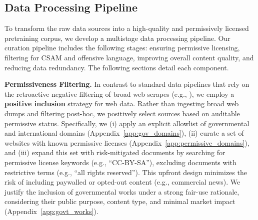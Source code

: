 \subsection{Data Processing Pipeline}
\label{sec:data_proc_pipe}
To transform the raw data sources into a high-quality and permissively licensed pretraining corpus, we develop a multistage data processing pipeline. Our curation pipeline includes the following stages: ensuring permissive licensing, filtering for CSAM and offensive language, improving overall content quality, and reducing data redundancy. The following sections detail each component.

\label{sec:positive_inclusion}
\textbf{Permissiveness Filtering.} In contrast to standard data pipelines that rely on the retroactive negative filtering of broad web scrapes (e.g., \citealp{fan2025can}), we employ a \textbf{positive inclusion} strategy for web data. Rather than ingesting broad web dumps and filtering post-hoc, we positively select sources based on auditable permissive status. Specifically, we (i) apply an explicit allowlist of governmental and international domains (Appendix~\ref{app:gov_domains}), (ii) curate a set of websites with known permissive licenses (Appendix~\ref{app:permissive_domains}), and (iii) expand this set with risk-mitigated documents by searching for permissive license keywords (e.g., “CC-BY-SA”), excluding documents with restrictive terms (e.g., “all rights reserved”). This upfront design minimizes the risk of including paywalled or opted-out content (e.g., commercial news). We justify the inclusion of governmental works under a strong fair-use rationale, considering their public purpose, content type, and minimal market impact (Appendix~\ref{app:govt_works}).


